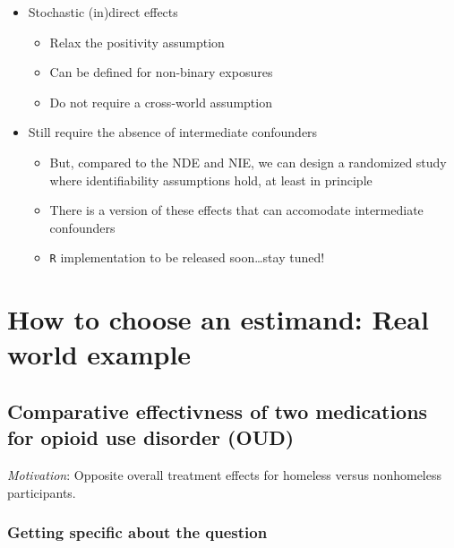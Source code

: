 \documentclass[
  12pt,
]{book}
\newcommand{\passthrough}[1]{#1}
\providecommand{\tightlist}{%
  \setlength{\itemsep}{0pt}\setlength{\parskip}{0pt}}
\theoremstyle{definition}
\theoremstyle{definition}
\theoremstyle{definition}
\newcommand{\1}{\mathbbm{1}}
\begin{document}
\begin{itemize}
\tightlist
\item
  Stochastic (in)direct effects

  \begin{itemize}
  \tightlist
  \item
    Relax the positivity assumption
  \item
    Can be defined for non-binary exposures
  \item
    Do not require a cross-world assumption
  \end{itemize}
\item
  Still require the absence of intermediate confounders

  \begin{itemize}
  \tightlist
  \item
    But, compared to the NDE and NIE, we can design a randomized study where
    identifiability assumptions hold, at least in principle
  \item
    There is a version of these effects that can accomodate intermediate
    confounders \citep{hejazi2020nonparametric}
  \item
    \passthrough{\lstinline!R!} implementation to be released soon\ldots stay tuned!
  \end{itemize}
\end{itemize}

\hypertarget{estimandirl}{%
\chapter{How to choose an estimand: Real world example}\label{estimandirl}}

\hypertarget{comparative-effectivness-of-two-medications-for-opioid-use-disorder-oud}{%
\section{Comparative effectivness of two medications for opioid use disorder (OUD)}\label{comparative-effectivness-of-two-medications-for-opioid-use-disorder-oud}}

\emph{Motivation}: Opposite overall treatment effects for homeless versus
nonhomeless participants.

\hypertarget{getting-specific-about-the-question}{%
\subsection{Getting specific about the question}\label{getting-specific-about-the-question}}
\end{document}
